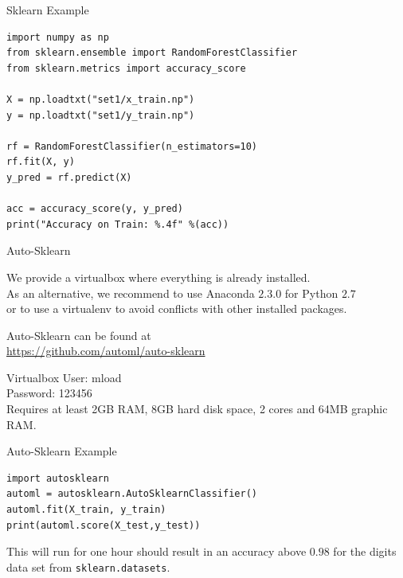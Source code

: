\documentclass[t,handout]{beamer}
\begin{document}
\begin{frame}[c, fragile]{Sklearn Example}

\small
\begin{verbatim}
import numpy as np
from sklearn.ensemble import RandomForestClassifier
from sklearn.metrics import accuracy_score

X = np.loadtxt("set1/x_train.np")  
y = np.loadtxt("set1/y_train.np")  
    
rf = RandomForestClassifier(n_estimators=10)
rf.fit(X, y)
y_pred = rf.predict(X)
    
acc = accuracy_score(y, y_pred)
print("Accuracy on Train: %.4f" %(acc))
\end{verbatim}

\end{frame}
\begin{frame}[c]{Auto-Sklearn}

We provide a virtualbox where everything is already installed.\\
As an alternative, we recommend to use Anaconda $2.3.0$ for Python $2.7$\\
or to use a virtualenv to avoid conflicts with other installed packages. 

\bigskip

Auto-Sklearn can be found at\\
\url{https://github.com/automl/auto-sklearn}

\bigskip

\begin{block}{Virtualbox}
User: mload\\
Password: 123456\\
Requires at least 2GB RAM, 8GB hard disk space, 2 cores and 64MB graphic RAM.
\end{block}

\end{frame}
\begin{frame}[c, fragile]{Auto-Sklearn Example}

\small
\begin{verbatim}
import autosklearn
automl = autosklearn.AutoSklearnClassifier()
automl.fit(X_train, y_train)
print(automl.score(X_test,y_test))
\end{verbatim}

\normal
This will run for one hour should result in an accuracy above $0.98$ for the digits data set from \texttt{sklearn.datasets}.

\end{frame}
\end{document}
